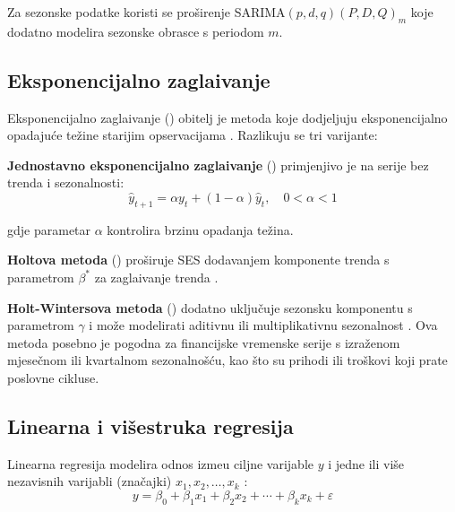 \documentclass[zavrsnirad]{fer}
\begin{document}
Za sezonske podatke koristi se pro\v{s}irenje SARIMA$(p,d,q)(P,D,Q)_m$ koje dodatno modelira sezonske obrasce s periodom $m$.

\subsection{Eksponencijalno zagla\dj ivanje}
\label{subsec:eksponencijalno_zagladjivanje}

Eksponencijalno zagla\dj ivanje () obitelj je metoda koje dodjeljuju eksponencijalno opadaju\'{c}e te\v{z}ine starijim opservacijama \citep{hyndman2021forecasting}. Razlikuju se tri varijante:

\textbf{Jednostavno eksponencijalno zagla\dj ivanje} () primjenjivo je na serije bez trenda i sezonalnosti:
\begin{equation}
    \hat{y}_{t+1} = \alpha y_t + (1 - \alpha) \hat{y}_t, \quad 0 < \alpha < 1
    \label{eq:ses}
\end{equation}

gdje parametar $\alpha$ kontrolira brzinu opadanja te\v{z}ina.

\textbf{Holtova metoda} () pro\v{s}iruje SES dodavanjem komponente trenda s parametrom $\beta^*$ za zagla\dj ivanje trenda \citep{hyndman2021forecasting}.

\textbf{Holt-Wintersova metoda} () dodatno uklju\v{c}uje sezonsku komponentu s parametrom $\gamma$ i mo\v{z}e modelirati aditivnu ili multiplikativnu sezonalnost \citep{hyndman2021forecasting}. Ova metoda posebno je pogodna za financijske vremenske serije s izra\v{z}enom mjese\v{c}nom ili kvartalnom sezonalno\v{s}\'{c}u, kao \v{s}to su prihodi ili tro\v{s}kovi koji prate poslovne cikluse.

\subsection{Linearna i vi\v{s}estruka regresija}
\label{subsec:regresija}

Linearna regresija modelira odnos izme\dj u ciljne varijable $y$ i jedne ili vi\v{s}e nezavisnih varijabli (zna\v{c}ajki) $x_1, x_2, \ldots, x_k$ \citep{hastie2009elements}:
\begin{equation}
    y = \beta_0 + \beta_1 x_1 + \beta_2 x_2 + \cdots + \beta_k x_k + \varepsilon
    \label{eq:regresija}
\end{equation}
\end{document}
